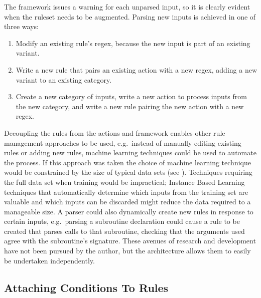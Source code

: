 \label{adding new rules in architecture}

The framework issues a warning for each unparsed input, so it is clearly
evident when the ruleset needs to be augmented.  Parsing new inputs is
achieved in one of three ways:

\begin{enumerate}

    \item Modify an existing rule's regex, because the new input is part of
        an existing variant.

    \item Write a new rule that pairs an existing action with a new regex,
        adding a new variant to an existing category.

    \item Create a new category of inputs, write a new action to process
        inputs from the new category, and write a new rule pairing the new
        action with a new regex.

\end{enumerate}

Decoupling the rules from the actions and framework enables other rule
management approaches to be used, e.g.\ instead of manually editing
existing rules or adding new rules, machine learning techniques could be
used to automate the process.  If this approach was taken the choice of
machine learning technique would be constrained by the size of typical data
sets (see ).  Techniques requiring the full
data set when training would be impractical; Instance Based
Learning~\cite{instance-based-learning} techniques that automatically
determine which inputs from the training set are valuable and which inputs
can be discarded might reduce the data required to a manageable size.  A
parser could also dynamically create new rules in response to certain
inputs, e.g.\ parsing a subroutine declaration could cause a rule to be
created that parses calls to that subroutine, checking that the arguments
used agree with the subroutine's signature.  These avenues of research and
development have not been pursued by the author, but the architecture
allows them to easily be undertaken independently.

\subsection{Attaching Conditions To Rules}

\label{attaching conditions to rules}

